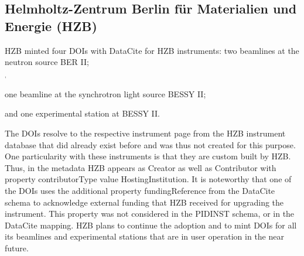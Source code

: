 \documentclass[a4paper,10pt,english]{sphinxmanual}
\begin{document}
\subsection{Helmholtz-Zentrum Berlin für Materialien und Energie (HZB)}
\label{\detokenize{white-paper/adoption:helmholtz-zentrum-berlin-fur-materialien-und-energie-hzb}}
HZB minted four DOIs with DataCite for HZB instruments: two beamlines
at the neutron source BER II;%
\begin{footnote}[1]\sphinxAtStartFootnote
{}
%
\end{footnote}$^{\text{,}}$%
\begin{footnote}[2]\sphinxAtStartFootnote
{}
%
\end{footnote} one
beamline at the synchrotron light source BESSY II;%
\begin{footnote}[3]\sphinxAtStartFootnote
{}
%
\end{footnote} and
one experimental station at BESSY II.%
\begin{footnote}[4]\sphinxAtStartFootnote
{}
%
\end{footnote} The DOIs resolve
to the respective instrument page from the HZB instrument database
that did already exist before and was thus not created for this
purpose.  One particularity with these instruments is that they are
custom built by HZB.  Thus, in the metadata HZB appears as Creator as
well as Contributor with property contributorType value
HostingInstitution.  It is noteworthy that one of the DOIs uses the
additional property fundingReference from the DataCite schema to
acknowledge external funding that HZB received for upgrading the
instrument.  This property was not considered in the PIDINST schema,
or in the DataCite mapping.  HZB plans to continue the adoption and to
mint DOIs for all its beamlines and experimental stations that are in
user operation in the near future.
\end{document}
